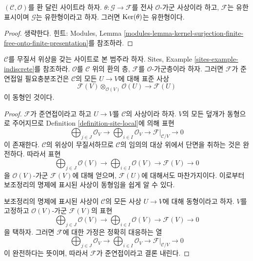 \begin{lemma}
\label{lemma-kernel-surjection-finite-onto-finite-presentation}
$(\mathcal{C}, \mathcal{O})$를 환 달린 사이트라 하자.
$\theta : \mathcal{G} \to \mathcal{F}$를 전사 $\mathcal{O}$-가군 사상이라
하고, $\mathcal{F}$는 유한 표시이며 $\mathcal{G}$는 유한형이라고 하자.
그러면 $\mathop{\mathrm{Ker}}(\theta)$는 유한형이다.
\end{lemma}

\begin{proof}
생략한다. 힌트: Modules, Lemma
\ref{modules-lemma-kernel-surjection-finite-free-onto-finite-presentation}를
참조하라.
\end{proof}

\begin{lemma}
\label{lemma-chaotic-quasi-coherent}
$\mathcal{C}$를 무질서 위상을 갖는 사이트로 본 범주라 하자. Sites, Example
\ref{sites-example-indiscrete}를 참조하라. $\mathcal{O}$를 $\mathcal{C}$ 위의
환의 층, $\mathcal{F}$를 $\mathcal{O}$-가군층이라 하자. 그러면
$\mathcal{F}$가 준연접일 필요충분조건은 $\mathcal{C}$의 모든
$U \to V$에 대해 표준 사상
$$
\mathcal{F}(V) \otimes_{\mathcal{O}(V)} \mathcal{O}(U)
\longrightarrow
\mathcal{F}(U)
$$
이 동형인 것이다.
\end{lemma}

\begin{proof}
$\mathcal{F}$가 준연접이라고 하고 $U \to V$를 $\mathcal{C}$의 사상이라
하자. $V$의 모든 덮개가 동형으로 주어지므로 Definition
\ref{definition-site-local}에 의해 표현
$$
\bigoplus\nolimits_{j \in J} \mathcal{O}_V \longrightarrow
\bigoplus\nolimits_{i \in I} \mathcal{O}_V \longrightarrow
\mathcal{F}|_{\mathcal{C}/V} \longrightarrow 0
$$
이 존재한다. $\mathcal{C}$의 위상이 무질서하므로 $\mathcal{C}$의 임의의
대상 위에서 단면을 취하는 것은 완전하다. 따라서 표현
$$
\bigoplus\nolimits_{j \in J} \mathcal{O}(V) \longrightarrow
\bigoplus\nolimits_{i \in I} \mathcal{O}(V) \longrightarrow
\mathcal{F}(V) \longrightarrow 0
$$
을 $\mathcal{O}(V)$-가군 $\mathcal{F}(V)$에 대해 얻으며,
$\mathcal{F}(U)$에 대해서도 마찬가지이다. 이로부터 보조정리의 명제에
표시된 사상이 동형임을 쉽게 알 수 있다.

\medskip\noindent
보조정리의 명제에 표시된 사상이 $\mathcal{C}$의 모든 사상 $U \to V$에
대해 동형이라고 하자. $V$를 고정하고 $\mathcal{O}(V)$-가군
$\mathcal{F}(V)$의 표현
$$
\bigoplus\nolimits_{j \in J} \mathcal{O}(V) \longrightarrow
\bigoplus\nolimits_{i \in I} \mathcal{O}(V) \longrightarrow
\mathcal{F}(V) \longrightarrow 0
$$
을 택하자. 그러면 $\mathcal{F}$에 대한 가정은 정확히 대응하는 열
$$
\bigoplus\nolimits_{j \in J} \mathcal{O}_V \longrightarrow
\bigoplus\nolimits_{i \in I} \mathcal{O}_V \longrightarrow
\mathcal{F}|_{\mathcal{C}/V} \longrightarrow 0
$$
이 완전하다는 뜻이며, 따라서 $\mathcal{F}$가 준연접이라고 결론 내린다.
\end{proof}


